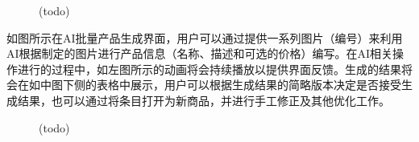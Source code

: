 \begin{figure}[htbp]
    \hfill
    \hfill
	\caption{(todo)}
	\label{fig:rma-ai-bulk}
\end{figure}

如图所示在AI批量产品生成界面，用户可以通过提供一系列图片（编号）来利用AI根据制定的图片进行产品信息（名称、描述和可选的价格）编写。在AI相关操作进行的过程中，如左图所示的动画将会持续播放以提供界面反馈。生成的结果将会在如中图下侧的表格中展示，用户可以根据生成结果的简略版本决定是否接受生成结果，也可以通过将条目打开为新商品，并进行手工修正及其他优化工作。

\begin{figure}[htbp]
    \hfill
    \hfill
	\caption{(todo)}
	\label{fig:rma-ir-plan}
\end{figure}

